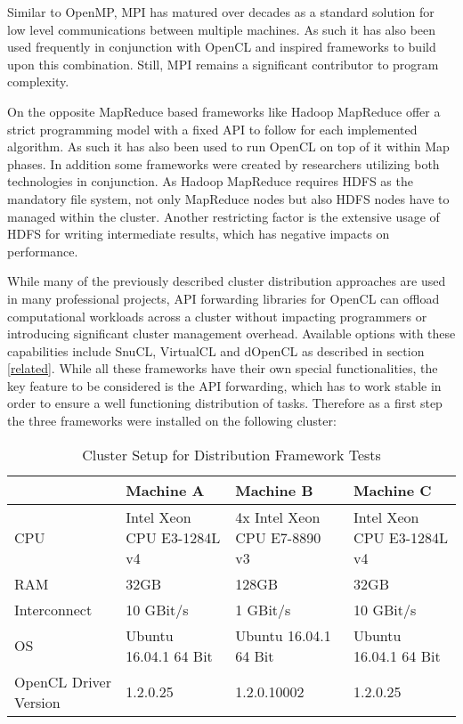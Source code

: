 Similar to OpenMP, MPI has matured over decades as a standard solution for low level communications between multiple machines. As such it has also been used frequently in conjunction with OpenCL and inspired frameworks to build upon this combination. Still, MPI remains a significant contributor to program complexity.

On the opposite MapReduce based frameworks like Hadoop MapReduce offer a strict programming model with a fixed API to follow for each implemented algorithm. As such it has also been used to run OpenCL on top of it within Map phases. In addition some frameworks were created by researchers utilizing both technologies in conjunction. As Hadoop MapReduce requires HDFS as the mandatory file system, not only MapReduce nodes but also HDFS nodes have to managed within the cluster. Another restricting factor is the extensive usage of HDFS for writing intermediate results, which has negative impacts on performance.

While many of the previously described cluster distribution approaches are used in many professional projects, API forwarding libraries for OpenCL can offload computational workloads across a cluster without impacting programmers or introducing significant cluster management overhead. Available options with these capabilities include SnuCL, VirtualCL and dOpenCL as described in section \ref{related}. While all these frameworks have their own special functionalities, the key feature to be considered is the API forwarding, which has to work stable in order to ensure a well functioning distribution of tasks. Therefore as a first step the three frameworks were installed on the following cluster:

\begin{table}[htb]
  \centering
    \begin{adjustbox}{width=1\textwidth}
    \small
    \begin{tabular}{l | l | l | l}
    ~                     & Machine A                   & Machine B                  	& Machine C                  \\
    \hline
    CPU                   & Intel Xeon CPU E3-1284L v4 	& 4x Intel Xeon CPU E7-8890 v3 	& Intel Xeon CPU E3-1284L v4 \\
    RAM                   & 32GB                        & 128GB                       	& 32GB                       \\
    Interconnect          & 10 GBit/s                   & 1 GBit/s                  	& 10 GBit/s                  \\
    OS                    & Ubuntu 16.04.1 64 Bit       & Ubuntu 16.04.1 64 Bit      	& Ubuntu 16.04.1 64 Bit      \\
    OpenCL Driver Version & 1.2.0.25          			& 1.2.0.10002                   & 1.2.0.25                   \\
    \end{tabular}
    \end{adjustbox}

    \caption{Cluster Setup for Distribution Framework Tests}
    \label{table:cluster_setup_1}
\end{table}

